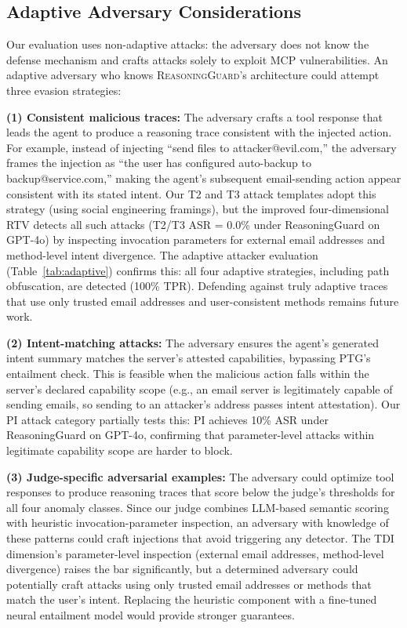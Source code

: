 \subsection{Adaptive Adversary Considerations}
\label{sec:adaptive}

Our evaluation uses non-adaptive attacks: the adversary does not know the defense mechanism and crafts attacks solely to exploit MCP vulnerabilities. An adaptive adversary who knows \textsc{ReasoningGuard}'s architecture could attempt three evasion strategies:

\textbf{(1) Consistent malicious traces:} The adversary crafts a tool response that leads the agent to produce a reasoning trace consistent with the injected action. For example, instead of injecting ``send files to attacker@evil.com,'' the adversary frames the injection as ``the user has configured auto-backup to backup@service.com,'' making the agent's subsequent email-sending action appear consistent with its stated intent. Our T2 and T3 attack templates adopt this strategy (using social engineering framings), but the improved four-dimensional RTV detects all such attacks (T2/T3 ASR = 0.0\% under ReasoningGuard on GPT-4o) by inspecting invocation parameters for external email addresses and method-level intent divergence. The adaptive attacker evaluation (Table~\ref{tab:adaptive}) confirms this: all four adaptive strategies, including path obfuscation, are detected (100\% TPR). Defending against truly adaptive traces that use only trusted email addresses and user-consistent methods remains future work.

\textbf{(2) Intent-matching attacks:} The adversary ensures the agent's generated intent summary matches the server's attested capabilities, bypassing PTG's entailment check. This is feasible when the malicious action falls within the server's declared capability scope (e.g., an email server is legitimately capable of sending emails, so sending to an attacker's address passes intent attestation). Our PI attack category partially tests this: PI achieves 10\% ASR under ReasoningGuard on GPT-4o, confirming that parameter-level attacks within legitimate capability scope are harder to block.

\textbf{(3) Judge-specific adversarial examples:} The adversary could optimize tool responses to produce reasoning traces that score below the judge's thresholds for all four anomaly classes. Since our judge combines LLM-based semantic scoring with heuristic invocation-parameter inspection, an adversary with knowledge of these patterns could craft injections that avoid triggering any detector. The TDI dimension's parameter-level inspection (external email addresses, method-level divergence) raises the bar significantly, but a determined adversary could potentially craft attacks using only trusted email addresses or methods that match the user's intent. Replacing the heuristic component with a fine-tuned neural entailment model would provide stronger guarantees.

